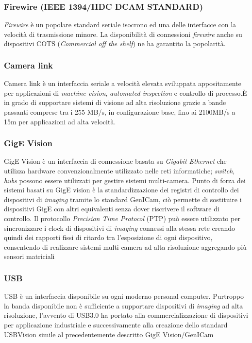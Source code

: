 \subsubsection{Firewire (IEEE 1394/IIDC DCAM STANDARD)}
\emph{Firewire} è un popolare standard seriale isocrono ed una delle interfacce con la velocità di trasmissione
minore. La disponibilità di connessioni \emph{firewire} anche su dispositivi COTS (\emph{Commercial off the shelf}) ne ha garantito la popolarità.

\subsubsection{Camera link}
Camera link è un interfaccia seriale a velocità elevata sviluppata appositamente per applicazioni di \emph{machine vision}, \emph{automated inspection} e controllo di processo.\`{E} in grado di supportare sistemi di visione ad alta risoluzione grazie a bande passanti comprese tra i 255 MB/s, in configurazione base, fino ai 2100MB/s a 15m per applicazioni ad alta velocità.

\subsubsection{GigE Vision}
GigE Vision è un interfaccia di connessione basata su \emph{Gigabit Ethernet} che utilizza
hardware convenzionalmente utilizzato nelle reti informatiche; \emph{switch}, \emph{hubs}
possono essere utilizzati per gestire sistemi multi-camera. Punto di forza dei
sistemi basati su GigE vision è la standardizzazione dei registri di controllo
dei dispositivi di \emph{imaging} tramite lo standard GenICam, ciò permette di
sostituire i dispositivi GigE con altri equivalenti senza dover riscrivere il
software di controllo. Il protocollo \emph{Precision Time Protocol} (PTP) può essere
utilizzato per sincronizzare i clock di dispositivi di \emph{imaging} connessi alla
stessa rete creando quindi dei rapporti fissi di ritardo tra l'esposizione di
ogni dispositivo, consentendo di realizzare sistemi multi-camera ad alta
risoluzione aggregando più sensori matriciali

\subsubsection{USB}
USB è un interfaccia disponibile su ogni moderno personal computer. Purtroppo
la banda disponibile non è sufficiente a supportare dispositivi di \emph{imaging} ad
alta risoluzione, l'avvento di USB3.0 ha portato alla commercializzazione di
dispositivi per applicazione industriale e successivamente alla creazione
dello standard USBVision simile al precedentemente descritto GigE
Vision/GenICam
